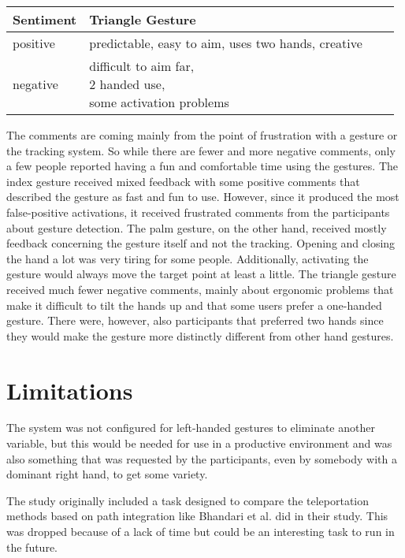 \begin{table}[]
\centering
\begin{tabular}{llll}
\hline
Sentiment &
    Triangle Gesture \\ \hline
positive &
    predictable, easy to aim, uses two hands, creative \\ \hline
negative &
    \makecell{difficult to aim far,\\ 2 handed use,\\ some activation problems} \\ \hline
\end{tabular}%
\label{tbl:interview3}
\end{table}

The comments are coming mainly from the point of frustration with a gesture or the tracking system. So while there are fewer and more negative comments, only a few people reported having a fun and comfortable time using the gestures. The index gesture received mixed feedback with some positive comments that described the gesture as fast and fun to use. However, since it produced the most false-positive activations, it received frustrated comments from the participants about gesture detection. The palm gesture, on the other hand, received mostly feedback concerning the gesture itself and not the tracking. Opening and closing the hand a lot was very tiring for some people. Additionally, activating the gesture would always move the target point at least a little. The triangle gesture received much fewer negative comments, mainly about ergonomic problems that make it difficult to tilt the hands up and that some users prefer a one-handed gesture. There were, however, also participants that preferred two hands since they would make the gesture more distinctly different from other hand gestures. 


\section{Limitations}
The system was not configured for left-handed gestures to eliminate another variable, but this would be needed for use in a productive environment and was also something that was requested by the participants, even by somebody with a dominant right hand, to get some variety. 

The study originally included a task designed to compare the teleportation methods based on path integration like Bhandari et al. \cite{Bhandari} did in their study. This was dropped because of a lack of time but could be an interesting task to run in the future.
